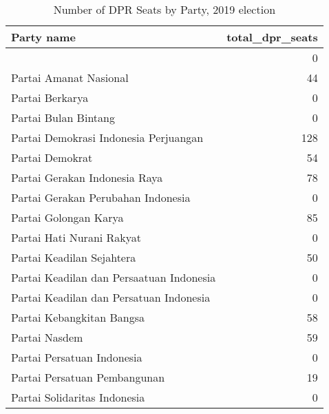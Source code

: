 
\begin{longtable}[t]{lr}
\caption{Number of DPR Seats by Party, 2019 election}\\
\toprule
Party name & total\_dpr\_seats\\
\midrule
 & 0\\
Partai Amanat Nasional & 44\\
Partai Berkarya & 0\\
Partai Bulan Bintang & 0\\
Partai Demokrasi Indonesia Perjuangan & 128\\
\addlinespace
Partai Demokrat & 54\\
Partai Gerakan Indonesia Raya & 78\\
Partai Gerakan Perubahan Indonesia & 0\\
Partai Golongan Karya & 85\\
Partai Hati Nurani Rakyat & 0\\
\addlinespace
Partai Keadilan Sejahtera & 50\\
Partai Keadilan dan Persaatuan Indonesia & 0\\
Partai Keadilan dan Persatuan Indonesia & 0\\
Partai Kebangkitan Bangsa & 58\\
Partai Nasdem & 59\\
\addlinespace
Partai Persatuan Indonesia & 0\\
Partai Persatuan Pembangunan & 19\\
Partai Solidaritas Indonesia & 0\\
\bottomrule
\end{longtable}
